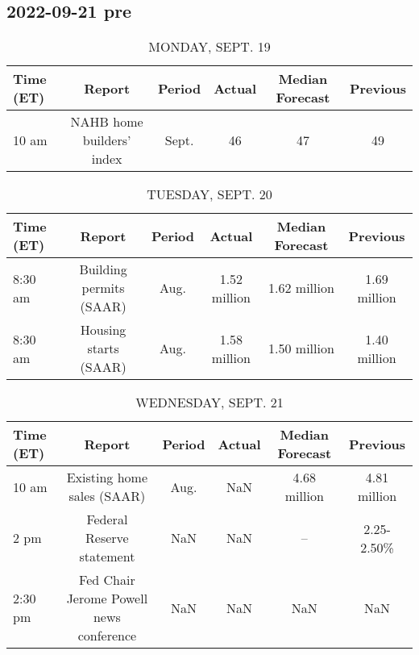 \documentclass{book}
\begin{document}
  \subsection{ 2022-09-21 pre }
  \normalsize%
  
  
  \begin{table}[htbp]%
  \caption{MONDAY, SEPT. 19}%
  \centering%
  \begin{adjustbox}{width=1\textwidth}%
  \begin{tabular}{lccccc}
  \toprule
  Time (ET) &                    Report & Period & Actual & Median Forecast & Previous \\
  \midrule
      10 am & NAHB home builders' index &  Sept. &     46 &              47 &       49 \\
  \bottomrule
  \end{tabular}
  \end{adjustbox}%
  \end{table}
  
  
  
  \begin{table}[htbp]%
  \caption{TUESDAY, SEPT. 20}%
  \centering%
  \begin{adjustbox}{width=1\textwidth}%
  \begin{tabular}{lccccc}
  \toprule
  Time (ET) &                  Report & Period &       Actual & Median Forecast &     Previous \\
  \midrule
    8:30 am & Building permits (SAAR) &   Aug. & 1.52 million &    1.62 million & 1.69 million \\
    8:30 am &   Housing starts (SAAR) &   Aug. & 1.58 million &    1.50 million & 1.40 million \\
  \bottomrule
  \end{tabular}
  \end{adjustbox}%
  \end{table}
  
  
  
  \begin{table}[htbp]%
  \caption{WEDNESDAY, SEPT. 21}%
  \centering%
  \begin{adjustbox}{width=1\textwidth}%
  \begin{tabular}{lccccc}
  \toprule
  Time (ET) &                                  Report & Period & Actual & Median Forecast &     Previous \\
  \midrule
      10 am &              Existing home sales (SAAR) &   Aug. &    NaN &    4.68 million & 4.81 million \\
       2 pm &               Federal Reserve statement &    NaN &    NaN &              -- &   2.25-2.50\% \\
    2:30 pm & Fed Chair Jerome Powell news conference &    NaN &    NaN &             NaN &          NaN \\
  \bottomrule
  \end{tabular}
  \end{adjustbox}%
  \end{table}
  
\end{document}
